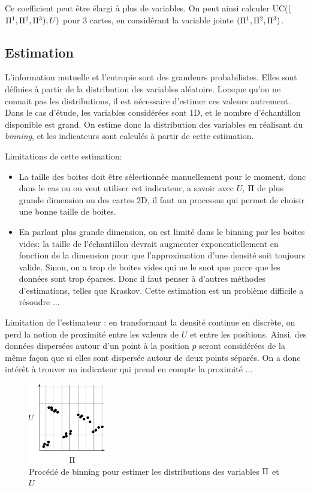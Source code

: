 Ce coefficient peut être élargi à plus de variables. On peut ainsi calculer UC(($\Pi^1,\Pi^2,\Pi^3),U)$ pour 3 cartes, en considérant la variable jointe $(\Pi^1,\Pi^2,\Pi^3)$.

\subsection{Estimation}

L'information mutuelle et l'entropie sont des grandeurs probabilistes. Elles sont définies à partir de la distribution des variables aléatoire. Lorsque qu'on ne connait pas les distributions, il est nécessaire d'estimer ces valeurs autrement. 
Dans le cas d'étude, les variables considérées sont 1D, et le nombre d'échantillon disponible est grand. On estime donc la distribution des variables en réalisant du \emph{binning}, et les indicateurs sont calculés à partir de cette estimation.

Limitations de cette estimation:
\begin{itemize}
\item La taille des boites doit être sélectionnée manuellement pour le moment, donc dans le cas ou on veut utiliser cet indicateur, a savoir avec $U$, $\Pi$ de plus grande dimension ou des cartes 2D, il faut un processus qui permet de choisir une bonne taille de boites.
\item En parlant plus grande dimension, on est limité dans le binning par les boites vides: la taille de l'échantillon devrait augmenter exponentiellement en fonction de la dimension pour que l'approximation d'une densité soit toujours valide. Sinon, on a trop de boites vides qui ne le snot que parce que les données sont trop éparses. Donc il faut penser à d'autres méthodes d'estimations, telles que Kraskov. Cette estimation est un problème difficile a résoudre ...
\end{itemize}

Limitation de l'estimateur : en transformant la densité continue en discrète, on perd la notion de proximité entre les valeurs de $U$ et entre les positions. Ainsi, des données dispersées autour d'un point à la position $p$ seront considérées de la même façon que si elles sont dispersée autour de deux points séparés. On a donc intérêt à trouver un indicateur qui prend en compte la proximité ...

\begin{figure}
\centering
\includegraphics[width=0.3\textwidth]{boxes}
\caption{Procédé de binning pour estimer les distributions des variables $\Pi$ et $U$}
\label{fig:binning} 
\end{figure}

